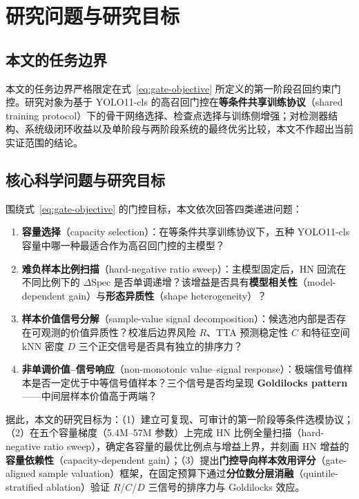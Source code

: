 \documentclass[UTF8,openany,12pt]{ctexbook}
\begin{document}
\section{研究问题与研究目标}
\subsection{本文的任务边界}
本文的任务边界严格限定在式~\eqref{eq:gate-objective} 所定义的第一阶段召回约束门控。研究对象为基于 YOLO11-cls 的高召回门控在\textbf{等条件共享训练协议}（shared training protocol）下的骨干网络选择、检查点选择与训练侧增强；对检测器结构、系统级闭环收益以及单阶段与两阶段系统的最终优劣比较，本文不作超出当前实证范围的结论。

\subsection{核心科学问题与研究目标}
围绕式~\eqref{eq:gate-objective} 的门控目标，本文依次回答四类递进问题：
\begin{enumerate}[leftmargin=2em,nosep]
\item \textbf{容量选择}（capacity selection）：在等条件共享训练协议下，五种 YOLO11-cls 容量中哪一种最适合作为高召回门控的主模型？
\item \textbf{难负样本比例扫描}（hard-negative ratio sweep）：主模型固定后，HN 回流在不同比例下的 $\Delta\mathrm{Spec}$ 是否单调递增？该增益是否具有\textbf{模型相关性}（model-dependent gain）与\textbf{形态异质性}（shape heterogeneity）？
\item \textbf{样本价值信号分解}（sample-value signal decomposition）：候选池内部是否存在可观测的价值异质性？校准后边界风险 $R$、TTA 预测稳定性 $C$ 和特征空间 kNN 密度 $D$ 三个正交信号是否具有独立的排序力？
\item \textbf{非单调价值--信号响应}（non-monotonic value--signal response）：极端信号值样本是否一定优于中等信号值样本？三个信号是否均呈现 \textbf{Goldilocks pattern}——中间层样本价值高于两端？
\end{enumerate}

据此，本文的研究目标为：（1）建立可复现、可审计的第一阶段等条件选模协议；（2）在五个容量梯度（5.4M--57M 参数）上完成 HN 比例全量扫描（hard-negative ratio sweep），确定各容量的最优比例点与增益上界，并刻画 HN 增益的\textbf{容量依赖性}（capacity-dependent gain）；（3）提出\textbf{门控导向样本效用评分}（gate-aligned sample valuation）框架，在固定预算下通过\textbf{分位数分层消融}（quintile-stratified ablation）验证 $R$/$C$/$D$ 三信号的排序力与 Goldilocks 效应。
\end{document}
